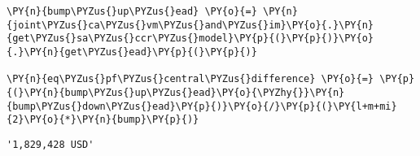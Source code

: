 \begin{tcolorbox}[breakable, size=fbox, boxrule=1pt, pad at break*=1mm,colback=cellbackground, colframe=cellborder]
\begin{Verbatim}[commandchars=\\\{\}]
\PY{n}{bump\PYZus{}up\PYZus{}ead} \PY{o}{=} \PY{n}{joint\PYZus{}ca\PYZus{}vm\PYZus{}and\PYZus{}im}\PY{o}{.}\PY{n}{get\PYZus{}sa\PYZus{}ccr\PYZus{}model}\PY{p}{(}\PY{p}{)}\PY{o}{.}\PY{n}{get\PYZus{}ead}\PY{p}{(}\PY{p}{)}

\PY{n}{eq\PYZus{}pf\PYZus{}central\PYZus{}difference} \PY{o}{=} \PY{p}{(}\PY{n}{bump\PYZus{}up\PYZus{}ead}\PY{o}{\PYZhy{}}\PY{n}{bump\PYZus{}down\PYZus{}ead}\PY{p}{)}\PY{o}{/}\PY{p}{(}\PY{l+m+mi}{2}\PY{o}{*}\PY{n}{bump}\PY{p}{)}
\end{Verbatim}
\end{tcolorbox}

            \begin{tcolorbox}[breakable, size=fbox, boxrule=.5pt, pad at break*=1mm, opacityfill=0]
\begin{Verbatim}[commandchars=\\\{\}]
'1,829,428 USD'
\end{Verbatim}
\end{tcolorbox}
        
